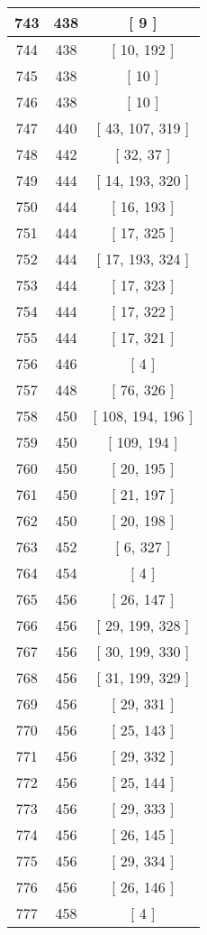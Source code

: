 \begin{center}
\begin{longtable}[H]{|| c c c ||}
\hline
743 & 438 & [ 9 ] \\ 
\hline
744 & 438 & [ 10, 192 ] \\ 
\hline
745 & 438 & [ 10 ] \\ 
\hline
746 & 438 & [ 10 ] \\ 
\hline
747 & 440 & [ 43, 107, 319 ] \\ 
\hline
748 & 442 & [ 32, 37 ] \\ 
\hline
749 & 444 & [ 14, 193, 320 ] \\ 
\hline
750 & 444 & [ 16, 193 ] \\ 
\hline
751 & 444 & [ 17, 325 ] \\ 
\hline
752 & 444 & [ 17, 193, 324 ] \\ 
\hline
753 & 444 & [ 17, 323 ] \\ 
\hline
754 & 444 & [ 17, 322 ] \\ 
\hline
755 & 444 & [ 17, 321 ] \\ 
\hline
756 & 446 & [ 4 ] \\ 
\hline
757 & 448 & [ 76, 326 ] \\ 
\hline
758 & 450 & [ 108, 194, 196 ] \\ 
\hline
759 & 450 & [ 109, 194 ] \\ 
\hline
760 & 450 & [ 20, 195 ] \\ 
\hline
761 & 450 & [ 21, 197 ] \\ 
\hline
762 & 450 & [ 20, 198 ] \\ 
\hline
763 & 452 & [ 6, 327 ] \\ 
\hline
764 & 454 & [ 4 ] \\ 
\hline
765 & 456 & [ 26, 147 ] \\ 
\hline
766 & 456 & [ 29, 199, 328 ] \\ 
\hline
767 & 456 & [ 30, 199, 330 ] \\ 
\hline
768 & 456 & [ 31, 199, 329 ] \\ 
\hline
769 & 456 & [ 29, 331 ] \\ 
\hline
770 & 456 & [ 25, 143 ] \\ 
\hline
771 & 456 & [ 29, 332 ] \\ 
\hline
772 & 456 & [ 25, 144 ] \\ 
\hline
773 & 456 & [ 29, 333 ] \\ 
\hline
774 & 456 & [ 26, 145 ] \\ 
\hline
775 & 456 & [ 29, 334 ] \\ 
\hline
776 & 456 & [ 26, 146 ] \\ 
\hline
777 & 458 & [ 4 ] \\ 

\end{longtable}
\end{center}
